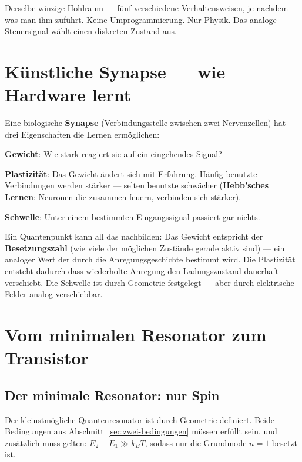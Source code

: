 Derselbe winzige Hohlraum --- fünf verschiedene Verhaltensweisen,
je nachdem was man ihm zuführt. Keine Umprogrammierung. Nur Physik.
Das analoge Steuersignal wählt einen diskreten Zustand aus.

\section{Künstliche Synapse --- wie Hardware lernt}
\label{sec:synapse}

Eine biologische \textbf{Synapse} (Verbindungsstelle zwischen
zwei Nervenzellen) hat drei Eigenschaften die Lernen ermöglichen:

\textbf{Gewicht}: Wie stark reagiert sie auf ein eingehendes Signal?

\textbf{Plastizität}: Das Gewicht ändert sich mit Erfahrung.
Häufig benutzte Verbindungen werden stärker ---
selten benutzte schwächer (\textbf{Hebb'sches Lernen}:
Neuronen die zusammen feuern, verbinden sich stärker).

\textbf{Schwelle}: Unter einem bestimmten Eingangssignal
passiert gar nichts.

Ein Quantenpunkt kann all das nachbilden:
Das Gewicht entspricht der \textbf{Besetzungszahl}
(wie viele der möglichen Zustände gerade aktiv sind) ---
ein analoger Wert der durch die Anregungsgeschichte bestimmt wird.
Die Plastizität entsteht dadurch dass wiederholte Anregung
den Ladungszustand dauerhaft verschiebt.
Die Schwelle ist durch Geometrie festgelegt ---
aber durch elektrische Felder analog verschiebbar.

\section{Vom minimalen Resonator zum Transistor}
\label{sec:transistor}

\subsection{Der minimale Resonator: nur Spin}

Der kleinstmögliche Quantenresonator ist durch Geometrie definiert.
Beide Bedingungen aus Abschnitt~\ref{sec:zwei-bedingungen}
müssen erfüllt sein, und zusätzlich muss gelten:
$E_2 - E_1 \gg k_BT$, sodass nur die Grundmode $n=1$ besetzt ist.

